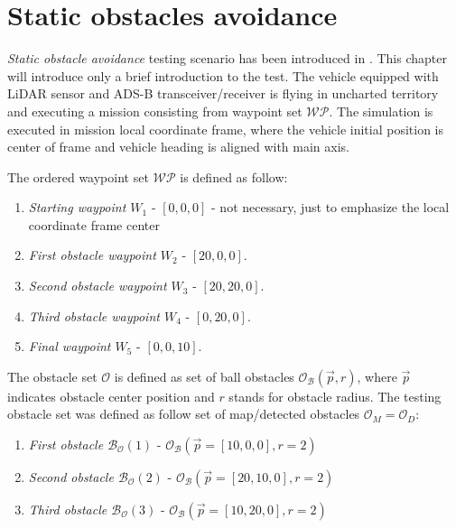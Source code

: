 \section{Static obstacles avoidance}\label{sec:staticObstacleAvoidanceSimulation}
\noindent \emph{Static obstacle avoidance} testing scenario has been introduced in \cite{alojzgomola2017}. This chapter will introduce only a brief introduction to the test. The vehicle equipped with LiDAR sensor and ADS-B transceiver/receiver is flying in uncharted territory and executing a mission consisting from waypoint set $\mathscr{WP}$. The simulation is executed in mission local coordinate frame, where the vehicle initial position is center of frame and vehicle heading is aligned with main axis.

\noindent The ordered waypoint set $\mathscr{WP}$ is defined as follow:
\begin{enumerate}
    
    \item\emph{Starting waypoint $W_1$} - $[0,0,0]$ - not necessary, just to emphasize the local coordinate frame center
    \item\emph{First obstacle waypoint $W_2$} - $[20,0,0]$.
    \item\emph{Second obstacle waypoint $W_3$} - $[20,20,0]$.
    \item\emph{Third obstacle waypoint $W_4$} - $[0,20,0]$.
    \item\emph{Final waypoint $W_5$} - $[0,0,10]$.
\end{enumerate}

\noindent The obstacle set $\mathscr{O}$ is defined as set of ball obstacles $\mathscr{O}_{\mathscr{B}}(\vec{p},r)$, where $\vec{p}$ indicates obstacle center position and $r$ stands for obstacle radius. The testing obstacle set was defined as follow set of map/detected obstacles $\mathscr{O}_M=\mathscr{O}_D$:
\begin{enumerate}
    \item\emph{First obstacle $\mathscr{B}_\mathscr{O}(1)$} -  $\mathscr{O}_{\mathscr{B}}(\vec{p}=[10,0,0],r=2)$
    \item\emph{Second obstacle $\mathscr{B}_\mathscr{O}(2)$} - $\mathscr{O}_{\mathscr{B}}(\vec{p}=[20,10,0],r=2)$
    \item\emph{Third obstacle $\mathscr{B}_\mathscr{O}(3)$} - 
    $\mathscr{O}_{\mathscr{B}}(\vec{p}=[10,20,0],r=2)$
\end{enumerate}


